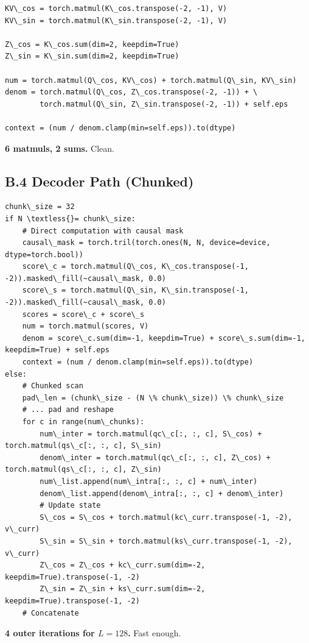 \begin{lstlisting}
KV\_cos = torch.matmul(K\_cos.transpose(-2, -1), V)
KV\_sin = torch.matmul(K\_sin.transpose(-2, -1), V)

Z\_cos = K\_cos.sum(dim=2, keepdim=True)
Z\_sin = K\_sin.sum(dim=2, keepdim=True)

num = torch.matmul(Q\_cos, KV\_cos) + torch.matmul(Q\_sin, KV\_sin)
denom = torch.matmul(Q\_cos, Z\_cos.transpose(-2, -1)) + \
        torch.matmul(Q\_sin, Z\_sin.transpose(-2, -1)) + self.eps

context = (num / denom.clamp(min=self.eps)).to(dtype)
\end{lstlisting}

\textbf{6 matmuls, 2 sums.} Clean.

\subsection{B.4 Decoder Path (Chunked)}

\begin{lstlisting}
chunk\_size = 32
if N \textless{}= chunk\_size:
    # Direct computation with causal mask
    causal\_mask = torch.tril(torch.ones(N, N, device=device, dtype=torch.bool))
    score\_c = torch.matmul(Q\_cos, K\_cos.transpose(-1, -2)).masked\_fill(~causal\_mask, 0.0)
    score\_s = torch.matmul(Q\_sin, K\_sin.transpose(-1, -2)).masked\_fill(~causal\_mask, 0.0)
    scores = score\_c + score\_s
    num = torch.matmul(scores, V)
    denom = score\_c.sum(dim=-1, keepdim=True) + score\_s.sum(dim=-1, keepdim=True) + self.eps
    context = (num / denom.clamp(min=self.eps)).to(dtype)
else:
    # Chunked scan
    pad\_len = (chunk\_size - (N \% chunk\_size)) \% chunk\_size
    # ... pad and reshape
    for c in range(num\_chunks):
        num\_inter = torch.matmul(qc\_c[:, :, c], S\_cos) + torch.matmul(qs\_c[:, :, c], S\_sin)
        denom\_inter = torch.matmul(qc\_c[:, :, c], Z\_cos) + torch.matmul(qs\_c[:, :, c], Z\_sin)
        num\_list.append(num\_intra[:, :, c] + num\_inter)
        denom\_list.append(denom\_intra[:, :, c] + denom\_inter)
        # Update state
        S\_cos = S\_cos + torch.matmul(kc\_curr.transpose(-1, -2), v\_curr)
        S\_sin = S\_sin + torch.matmul(ks\_curr.transpose(-1, -2), v\_curr)
        Z\_cos = Z\_cos + kc\_curr.sum(dim=-2, keepdim=True).transpose(-1, -2)
        Z\_sin = Z\_sin + ks\_curr.sum(dim=-2, keepdim=True).transpose(-1, -2)
    # Concatenate
\end{lstlisting}

\textbf{4 outer iterations for $L = 128$.} Fast enough.

